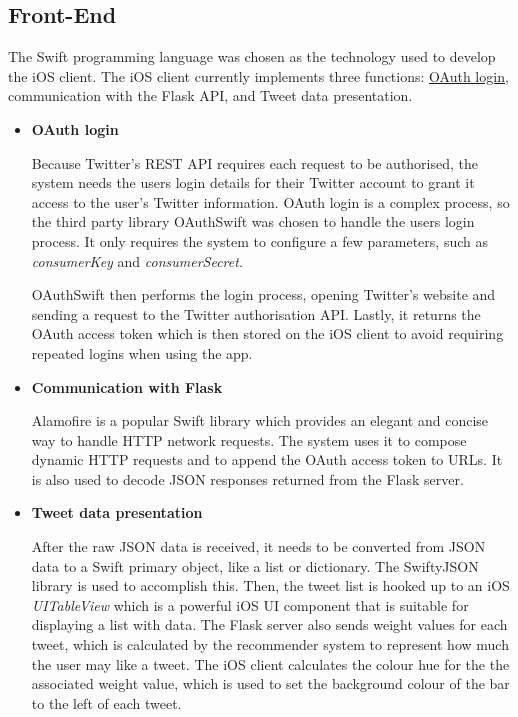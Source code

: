 \documentclass{article}
\begin{document}
\newpage


\subsection{Front-End}
The Swift programming language was chosen as the technology used to develop the iOS client. The iOS client currently implements three functions: \hyperlink{oauth}{OAuth login}, communication with the Flask API, and Tweet data presentation.


\begin{itemize}
    \item \textbf{OAuth login}

    Because Twitter's REST API requires each request to be authorised, the system needs the users login details for their Twitter account to grant it access to the user's Twitter information. OAuth login is a complex process, so the third party library OAuthSwift \cite{oauthswift} was chosen to handle the users login process. It only requires the system to configure a few parameters, such as \textit{consumerKey} and \textit{consumerSecret}. 
    
    OAuthSwift then performs the login process, opening Twitter's website and sending a request to the Twitter authorisation API.
    Lastly, it returns the OAuth access token which is then stored on the iOS client to avoid requiring repeated logins when using the app.
 
    \item \textbf{Communication with Flask}

    Alamofire \cite{alamofire} is a popular Swift library which provides an elegant and concise way to handle HTTP network requests. The system uses it to compose dynamic HTTP requests and to append the OAuth access token to URLs. It is also used to decode JSON responses returned from the Flask server.

    \item \textbf{Tweet data presentation}
 
    After the raw JSON data is received, it needs to be converted from JSON data to a Swift primary object, like a list or dictionary. The SwiftyJSON \cite{swiftyjson} library is used to accomplish this. Then, the tweet list is hooked up to an iOS \textit{UITableView} which is a powerful iOS UI component that is suitable for displaying a list with data. The Flask server also sends weight values for each tweet, which is calculated by the recommender system to represent how much the user may like a tweet. The iOS client calculates the colour hue for the the associated weight value, which is used to set the background colour of the bar to the left of each tweet.
\end{itemize}
\end{document}
